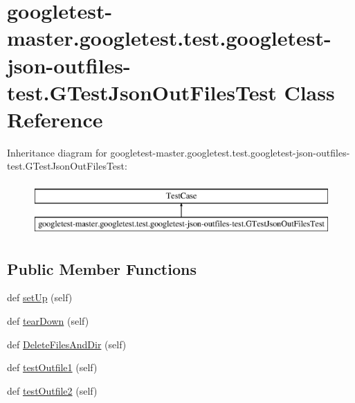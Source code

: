 \hypertarget{classgoogletest-master_1_1googletest_1_1test_1_1googletest-json-outfiles-test_1_1_g_test_json_out_files_test}{}\section{googletest-\/master.googletest.\+test.\+googletest-\/json-\/outfiles-\/test.G\+Test\+Json\+Out\+Files\+Test Class Reference}
\label{classgoogletest-master_1_1googletest_1_1test_1_1googletest-json-outfiles-test_1_1_g_test_json_out_files_test}
Inheritance diagram for googletest-\/master.googletest.\+test.\+googletest-\/json-\/outfiles-\/test.G\+Test\+Json\+Out\+Files\+Test\+:\begin{figure}[H]
\begin{center}
\leavevmode
\includegraphics[height=2.000000cm]{d2/d56/classgoogletest-master_1_1googletest_1_1test_1_1googletest-json-outfiles-test_1_1_g_test_json_out_files_test}
\end{center}
\end{figure}
\subsection*{Public Member Functions}
\begin{DoxyCompactItemize}
\item 
def \mbox{\hyperlink{classgoogletest-master_1_1googletest_1_1test_1_1googletest-json-outfiles-test_1_1_g_test_json_out_files_test_a6913b504baa9b44cd466b48a0e49fa83}{set\+Up}} (self)
\item 
def \mbox{\hyperlink{classgoogletest-master_1_1googletest_1_1test_1_1googletest-json-outfiles-test_1_1_g_test_json_out_files_test_a1c9d8301ea5552a270823c73f583886d}{tear\+Down}} (self)
\item 
def \mbox{\hyperlink{classgoogletest-master_1_1googletest_1_1test_1_1googletest-json-outfiles-test_1_1_g_test_json_out_files_test_ab4644b1ea45cc86b9ff47d4269d03bf2}{Delete\+Files\+And\+Dir}} (self)
\item 
def \mbox{\hyperlink{classgoogletest-master_1_1googletest_1_1test_1_1googletest-json-outfiles-test_1_1_g_test_json_out_files_test_ac26c6384721e884efdfb5a63fa48aec4}{test\+Outfile1}} (self)
\item 
def \mbox{\hyperlink{classgoogletest-master_1_1googletest_1_1test_1_1googletest-json-outfiles-test_1_1_g_test_json_out_files_test_a8024384d853f869e08b22cee2623bd8f}{test\+Outfile2}} (self)
\end{DoxyCompactItemize}
